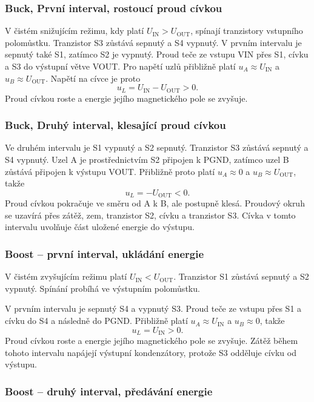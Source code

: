 \subsubsection{Buck, První interval, rostoucí proud cívkou}
V čistém snižujícím režimu, kdy platí $U_{\mathrm{IN}}>U_{\mathrm{OUT}}$, spínají tranzistory vstupního polomůstku. Tranzistor S3 zůstává sepnutý a S4 vypnutý. V prvním intervalu je sepnutý také S1, zatímco S2 je vypnutý. Proud teče ze vstupu VIN přes S1, cívku a S3 do výstupní větve VOUT. Pro napětí uzlů přibližně platí $u_A\approx U_{\mathrm{IN}}$ a $u_B\approx U_{\mathrm{OUT}}$. Napětí na cívce je proto\[u_L=U_{\mathrm{IN}}-U_{\mathrm{OUT}}>0.\] Proud cívkou roste a energie jejího magnetického pole se zvyšuje.

\subsubsection{Buck, Druhý interval, klesající proud cívkou}
Ve druhém intervalu je S1 vypnutý a S2 sepnutý. Tranzistor S3 zůstává sepnutý a S4 vypnutý. Uzel A je prostřednictvím S2 připojen k PGND, zatímco uzel B zůstává připojen k výstupu VOUT. Přibližně proto platí $u_A\approx0$ a $u_B\approx U_{\mathrm{OUT}}$, takže \[ u_L=-U_{\mathrm{OUT}}<0. \] Proud cívkou pokračuje ve směru od A k B, ale postupně klesá. Proudový okruh se uzavírá přes zátěž, zem, tranzistor S2, cívku a tranzistor S3. Cívka v tomto intervalu uvolňuje část uložené energie do výstupu.

\subsubsection{Boost -- první interval, ukládání energie}
\label{teorie_Boost_first_interval}
V čistém zvyšujícím režimu platí
$U_{\mathrm{IN}}<U_{\mathrm{OUT}}$.
Tranzistor S1 zůstává sepnutý a S2 vypnutý.
Spínání probíhá ve výstupním polomůstku.

V prvním intervalu je sepnutý S4 a vypnutý S3.
Proud teče ze vstupu přes S1 a cívku do S4
a následně do PGND. Přibližně platí
$u_A\approx U_{\mathrm{IN}}$ a $u_B\approx0$,
takže
\[
    u_L=U_{\mathrm{IN}}>0.
\]
Proud cívkou roste a energie jejího magnetického
pole se zvyšuje. Zátěž během tohoto intervalu
napájejí výstupní kondenzátory, protože S3
odděluje cívku od výstupu.

\subsubsection{Boost -- druhý interval, předávání energie}

